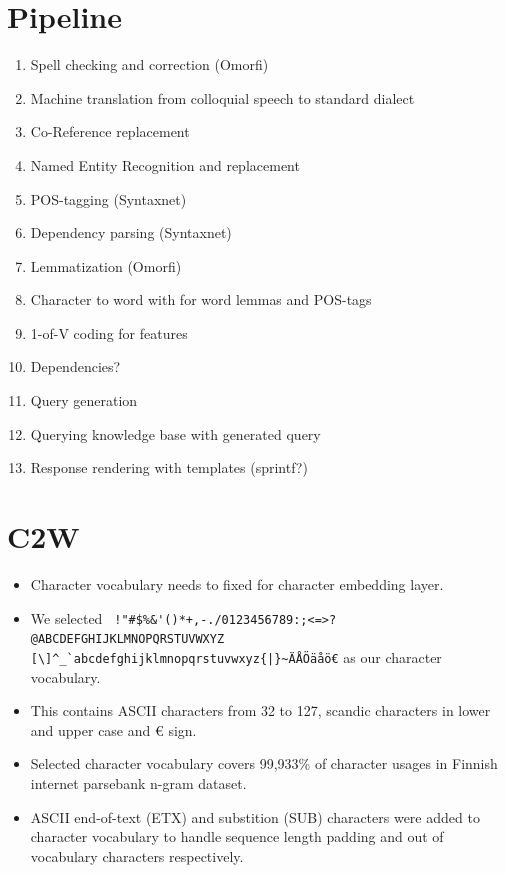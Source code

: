 \documentclass[12pt,a4paper,english
]{tutthesis}
\begin{document}
\section{Pipeline}
\label{se:pipeline}
\begin{enumerate}
\item Spell checking and correction (Omorfi)
\item Machine translation from colloquial speech to standard dialect
\item Co-Reference replacement
\item Named Entity Recognition and replacement
\item POS-tagging (Syntaxnet)
\item Dependency parsing (Syntaxnet)
\item Lemmatization (Omorfi)
\item Character to word with \cite{Ling2015} for word lemmas and POS-tags
\item 1-of-V coding for features
\item Dependencies?
\item Query generation
\item Querying knowledge base with generated query
\item Response rendering with templates (sprintf?)
\end{enumerate}

\section{C2W}
\label{se:c2w}
\begin{itemize}
\item Character vocabulary needs to fixed for character embedding layer.
\item We selected \verb£ !"#$%&'()*+,-./0123456789:;<=>?@ABCDEFGHIJKLMNOPQRSTUVWXYZ£ \verb£[\]^_`abcdefghijklmnopqrstuvwxyz{|}~ÄÅÖäåö€£ as our character vocabulary.
\item This contains ASCII characters from 32 to 127, scandic characters in lower and upper case and € sign.
\item Selected character vocabulary covers 99,933\% of character usages in Finnish internet parsebank n-gram dataset.
\item ASCII end-of-text (ETX) and substition (SUB) characters were added to character vocabulary to handle sequence length padding and out of vocabulary characters respectively.
\end{itemize}
\end{document}
